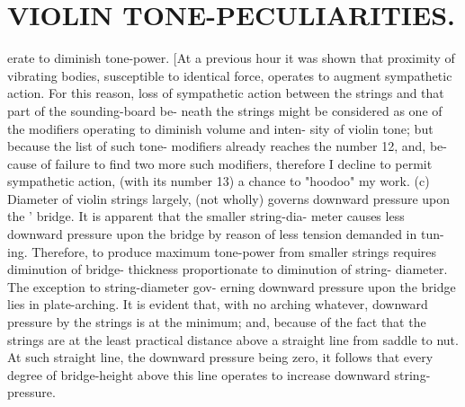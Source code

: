 \documentclass{article}
\begin{document}
\section*{VIOLIN TONE-PECULIARITIES.}
erate to diminish tone-power. [At a previous hour it was shown that proximity of vibrating bodies, susceptible to identical force, operates to augment sympathetic action. For this reason, loss of sympathetic action between the strings and that part of the sounding-board be- neath the strings might be considered as one of the modifiers operating to diminish volume and inten- sity of violin tone; but because the list of such tone- modifiers already reaches the number 12, and, be- cause of failure to find two more such modifiers, therefore I decline to permit sympathetic action, (with its number 13) a chance to "hoodoo" my work. (c) Diameter of violin strings largely, (not wholly) governs downward pressure upon the ' bridge. It is apparent that the smaller string-dia- meter causes less downward pressure upon the bridge by reason of less tension demanded in tun- ing. Therefore, to produce maximum tone-power from smaller strings requires diminution of bridge- thickness proportionate to diminution of string- diameter. The exception to string-diameter gov- erning downward pressure upon the bridge lies in plate-arching. It is evident that, with no arching whatever, downward pressure by the strings is at the minimum; and, because of the fact that the strings are at the least practical distance above a straight line from saddle to nut. At such straight line, the downward pressure being zero, it follows that every degree of bridge-height above this line operates to increase downward string-pressure.
\end{document}
